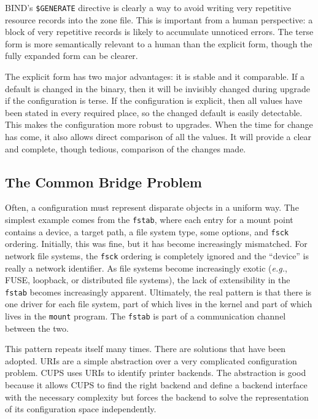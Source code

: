 \documentclass[letterpaper,twocolumn,10pt]{article}
\begin{document}
BIND's \texttt{\$GENERATE} directive is clearly a way to avoid writing very repetitive resource records into the zone file. This is important from a human perspective: a block of very repetitive records is likely to accumulate unnoticed errors. The terse form is more semantically relevant to a human than the explicit form, though the fully expanded form can be clearer.

The explicit form has two major advantages: it is stable and it comparable. If a default is changed in the binary, then it will be invisibly changed during upgrade if the configuration is terse. If the configuration is explicit, then all values have been stated in every required place, so the changed default is easily detectable. This makes the configuration more robust to upgrades. When the time for change has come, it also allows direct comparison of all the values. It will provide a clear and complete, though tedious, comparison of the changes made.

\subsection{The Common Bridge Problem}
Often, a configuration must represent disparate objects in a uniform way. The simplest example comes from the \texttt{fstab}, where each entry for a mount point contains a device, a target path, a file system type, some options, and \texttt{fsck} ordering.\cite{fstab} Initially, this was fine, but it has become increasingly mismatched. For network file systems, the \texttt{fsck} ordering is completely ignored and the ``device'' is really a network identifier. As file systems become increasingly exotic (\emph{e.g.}, FUSE, loopback, or distributed file systems), the lack of extensibility in the \texttt{fstab} becomes increasingly apparent. Ultimately, the real pattern is that there is one driver for each file system, part of which lives in the kernel and part of which lives in the \texttt{mount} program. The \texttt{fstab} is part of a communication channel between the two.

This pattern repeats itself many times. There are solutions that have been adopted. URIs are a simple abstraction over a very complicated configuration problem. CUPS uses URIs to identify printer backends. The abstraction is good because it allows CUPS to find the right backend and define a backend interface with the necessary complexity but forces the backend to solve the representation of its configuration space independently.
\end{document}
